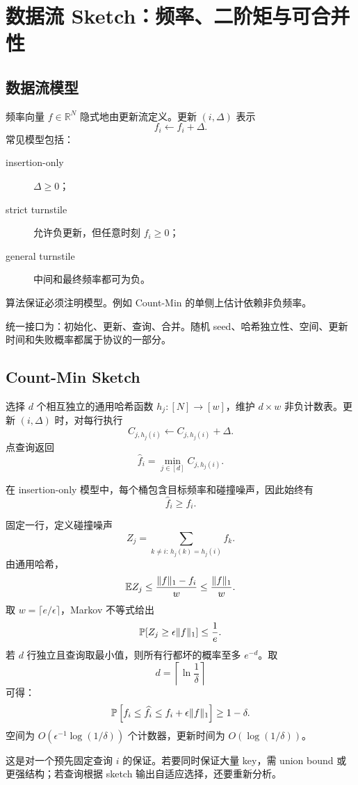 \chapter{数据流 Sketch：频率、二阶矩与可合并性}

\section{数据流模型}

频率向量 $f\in\mathbb R^N$ 隐式地由更新流定义。更新 $(i,\Delta)$ 表示
\[
f_i\leftarrow f_i+\Delta.
\]
常见模型包括：
\begin{description}
  \item[insertion-only] $\Delta\ge0$；
  \item[strict turnstile] 允许负更新，但任意时刻 $f_i\ge0$；
  \item[general turnstile] 中间和最终频率都可为负。
\end{description}
算法保证必须注明模型。例如 Count-Min 的单侧上估计依赖非负频率。

统一接口为：初始化、更新、查询、合并。随机 seed、哈希独立性、空间、更新时间和失败概率都属于协议的一部分。

\section{Count-Min Sketch}

选择 $d$ 个相互独立的通用哈希函数 $h_j:[N]\to[w]$，维护 $d\times w$ 非负计数表。更新 $(i,\Delta)$ 时，对每行执行
\[
C_{j,h_j(i)}\leftarrow C_{j,h_j(i)}+\Delta.
\]
点查询返回
\[
\widehat f_i=\min_{j\in[d]}C_{j,h_j(i)}.
\]

在 insertion-only 模型中，每个桶包含目标频率和碰撞噪声，因此始终有
\[
\widehat f_i\ge f_i.
\]

固定一行，定义碰撞噪声
\[
Z_j=\sum_{k\ne i:\,h_j(k)=h_j(i)}f_k.
\]
由通用哈希，
\[
\mathbb{E} Z_j
\le\frac{\|f\|_1-f_i}{w}
\le\frac{\|f\|_1}{w}.
\]
取 $w=\lceil e/\epsilon\rceil$，Markov 不等式给出
\[
\mathbb{P}[Z_j\ge\epsilon\|f\|_1]\le\frac1e.
\]
若 $d$ 行独立且查询取最小值，则所有行都坏的概率至多 $e^{-d}$。取
\[
d=\left\lceil\ln\frac1\delta\right\rceil
\]
可得：
\[
\mathbb{P}\left[f_i\le\widehat f_i
\le f_i+\epsilon\|f\|_1\right]\ge1-\delta.
\]
空间为 $O(\epsilon^{-1}\log(1/\delta))$ 个计数器，更新时间为 $O(\log(1/\delta))$。

\begin{warningbox}
这是对一个预先固定查询 $i$ 的保证。若要同时保证大量 key，需 union bound 或更强结构；若查询根据 sketch 输出自适应选择，还要重新分析。
\end{warningbox}

